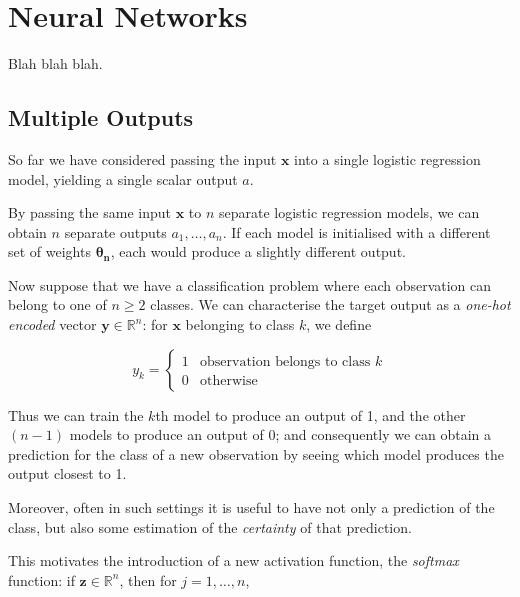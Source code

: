 \documentclass{article}[11pt]
\begin{document}
\section{Neural Networks}
    
    Blah blah blah.
    
    
    

    \subsection{Multiple Outputs} \label{sec:multi_out}
    
        So far we have considered passing the input $\mathbf{x}$ into a single logistic regression model, yielding a single scalar output $a$.
    
        By passing the same input $\mathbf{x}$ to $n$ separate logistic regression models, we can obtain $n$ separate outputs $a_1, \ldots, a_n$. If each model is initialised with a different set of weights $\boldsymbol{\theta_n}$, each would produce a slightly different output.
        
        Now suppose that we have a classification problem where each observation can belong to one of $n \geq 2$ classes. We can characterise the target output as a \textit{one-hot encoded} vector $\mathbf{y} \in \mathbb{R}^n$: for $\mathbf{x}$ belonging to class $k$, we define
        
        $$
        y_k = \begin{cases}
            1 & \text{observation belongs to class } k \\
            0 & \text{otherwise}
        \end{cases}
        $$
        
        Thus we can train the $k$th model to produce an output of 1, and the other $(n-1)$ models to produce an output of 0; and consequently we can obtain a prediction for the class of a new observation by seeing which model produces the output closest to 1.

        Moreover, often in such settings it is useful to have not only a prediction of the class, but also some estimation of the \textit{certainty} of that prediction.
        
        This motivates the introduction of a new activation function, the \textit{softmax} function: if $\mathbf{z} \in \mathbb{R}^n$, then for $j = 1, \ldots, n$,
        
\end{document}
